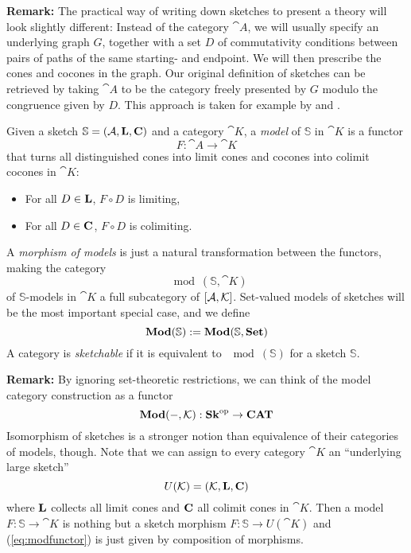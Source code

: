 \textbf{Remark:} The practical way of writing down sketches to present a theory will look slightly different: Instead of the category $\cat A$, we will usually specify an underlying graph $G$, together with a set $D$ of commutativity conditions between pairs of paths of the same starting- and endpoint. We will then prescribe the cones and cocones in the graph. Our original definition of sketches can be retrieved by taking $\cat A$ to be the category freely presented by $G$ modulo the congruence given by $D$. This approach is taken for example by \cite{MakkaiPare} and \cite{elephant}.

\begin{Definition}
Given a sketch $\mathbb S = (\mathcal{A}, \textbf{L}, \textbf{C})$ and a category $\cat K$, a \emph{model} of $\mathbb S$ in $\cat K$ is a functor
\[ F : \cat A \to \cat K \]
that turns all distinguished cones into limit cones and cocones into colimit cocones in $\cat K$:\begin{itemize}
\item For all $D \in \textbf{L}$, $F \circ D$ is limiting,
\item For all $D \in \textbf{C}$, $F \circ D$ is colimiting.
\end{itemize}

A \emph{morphism of models} is just a natural transformation between the functors, making the category \[ \mod(\mathbb S, \cat K) \]
of $\mathbb S$-models in $\cat K$ a full subcategory of $[\mathcal{A},\mathcal{K}]$. Set-valued models of sketches will be the most important special case, and we define
\[ \mathbf{Mod}(\mathbb S) := \mathbf{Mod}(\mathbb S, \mathbf{Set}) \]
A category is \emph{sketchable} if it is equivalent to $\mod(\mathbb S)$ for a sketch $\mathbb S$.
\end{Definition}

\textbf{Remark:} By ignoring set-theoretic restrictions, we can think of the model category construction as a functor
\begin{equation}
\label{eq:modfunctor} \mathbf{Mod}(-, \mathcal{K}) : \mathbf{Sk}^{\textrm{op}} \to \mathbf{CAT}
\end{equation}
Isomorphism of sketches is a stronger notion than equivalence of their categories of models, though. Note that we can assign to every category $\cat K$ an ``underlying large sketch'' 
\[ U(\mathcal{K}) = (\mathcal{K}, \textbf{L}, \textbf{C}) \]
where $\textbf{L}$ collects all limit cones and $\textbf{C}$ all colimit cones in $\cat K$. Then a model $F : \mathbb S \to \cat K$ is nothing but a sketch morphism $F : \mathbb S \to U(\cat K)$ and (\ref{eq:modfunctor}) is just given by composition of morphisms. \\

